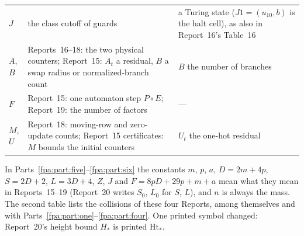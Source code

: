 \documentclass[11pt,a4paper]{article}
\numberwithin{equation}{section}
\begin{document}
\begin{center}
\begin{longtable}{@{}p{}p{}p{}@{}}
$J$ & the class cutoff of guards & a Turing state ($J1=(u_{10},b)$ is the halt cell), as also in Report~16's Table~16\\
$A$, $B$ & Reports~16--18: the two physical counters; Report~15: $A_t$ a residual, $B$ a swap radius or normalized-branch count & $B$ the number of branches\\
$F$ & Report~15: one automaton step $P\circ E$; Report~19: the number of factors & ---\\
$M$, $U$ & Report~18: moving-row and zero-update counts; Report~15 certificates: $M$ bounds the initial counters & $U_t$ the one-hot residual\\
\bottomrule
\end{longtable}
\end{center}
In Parts~\ref{fpa:part:five}--\ref{fpa:part:six} the constants $m$, $p$, $a$, $D=2m+4p$, $S=2D+2$, $L=3D+4$, $Z$, $J$ and $F=8pD+29p+m+a$ mean what they mean in Reports~15--19 (Report~20 writes $S_0$, $L_0$ for $S$, $L$), and $n$ is always the mass. The second table lists the collisions of these four Reports, among themselves and with Parts~\ref{fpa:part:one}--\ref{fpa:part:four}. One printed symbol changed: Report~20's height bound $H_*$ is printed $\mathrm{Ht}_*$.
\end{document}
